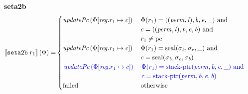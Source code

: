 \documentclass[a4paper]{article}
\begin{document}
\noindent\textbf{seta2b}\\
\begin{align*}
  \sem{\tsetatob{r_1}}(\Phi) = & 
                                \begin{cases}
                                  \updPcAddr{}\left(
                                    \Phi \updReg{r_1}{c}
                                    \right)
&
                                    \arraycolsep=0pt
                                    \begin{array}[t]{l}
                                      \Phi(r_1) = ((\perm,\lin),\baddr,\eaddr,\_) \tand \\
                                      c = ((\perm,\lin),\baddr,\eaddr,\baddr) \tand\\
                                      r_1 \neq \pcreg
                                    \end{array} \\
                                  \updPcAddr{}\left(
                                    \Phi \updReg{r_1}{c}
                                    \right)
&
                                    \arraycolsep=0pt
                                    \begin{array}[t]{l}
                                      \Phi(r_1) = \seal{\sigma_\baddr,\sigma_\eaddr,\_} \tand \\
                                      c = \seal{\sigma_\baddr,\sigma_\eaddr,\sigma_\baddr}
                                    \end{array} \\
\sourcecolor\left.
                                  \updPcAddr{}\left(
                                    \Phi\updReg{r_1}{c}
                                    \right)
\right.
&
\sourcecolor\left.
                                    \arraycolsep=0pt
                                    \begin{array}[t]{l}
                                      \Phi(r_1) = \stkptr{\perm,\baddr,\eaddr,\_} \tand \\
                                      c = \stkptr{\perm,\baddr,\eaddr,\baddr}
                                    \end{array}\right. \\
                                    \failed & \totherwise
                                \end{cases}
\end{align*}
\end{document}
